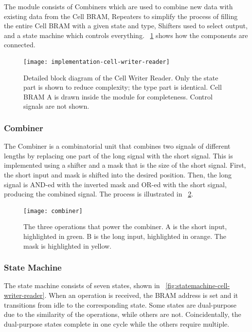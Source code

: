 The module consists of Combiners which are used to combine new data with existing data from the Cell BRAM, Repeaters to simplify the process of filling the entire Cell BRAM with a given state and type, Shifters used to select output, and a state machine which controls everything.
\figurename~\ref{fig:implementation-cell-writer-reader} shows how the components are connected.

\begin{figure}[!ht]
    \hspace{-1\block}
    \texttt{[image: implementation-cell-writer-reader]}
    \caption[Cell Writer Reader]{
        Detailed block diagram of the Cell Writer Reader.
        Only the state part is shown to reduce complexity; the type part is identical.
        Cell BRAM A is drawn inside the module for completeness.
        Control signals are not shown.
    }
    \label{fig:implementation-cell-writer-reader}
\end{figure}

\subsubsection{Combiner}

The Combiner is a combinatorial unit that combines two signals of different lengths by replacing one part of the long signal with the short signal.
This is implemented using a shifter and a mask that is the size of the short signal.
First, the short input and mask is shifted into the desired position.
Then, the long signal is AND-ed with the inverted mask and OR-ed with the short signal, producing the combined signal.
The process is illustrated in \figurename~\ref{fig:combiner}.

\begin{figure}[!ht]
    \centering
    \texttt{[image: combiner]}
    \caption[Combiner operation]{
        The three operations that power the combiner.
        A is the short input, highlighted in green.
        B is the long input, highlighted in orange.
        The mask is highlighted in yellow.
    }
    \label{fig:combiner}
\end{figure}

\subsubsection{State Machine}

The state machine consists of seven states, shown in \figurename~\ref{fig:statemachine-cell-writer-reader}.
When an operation is received, the BRAM address is set and it transitions from idle to the corresponding state.
Some states are dual-purpose due to the similarity of the operations, while others are not.
Coincidentally, the dual-purpose states complete in one cycle while the others require multiple\footnotemark.

